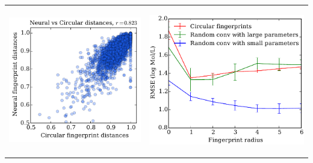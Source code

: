 \documentclass[landscape,a0b,final,a4resizeable]{include/a0poster}
\begin{document}
\begin{poster}
\begin{multicols}{3}
\begin{tabular}{cc}
\begin{minipage}[c]{0.45\columnwidth}
\includegraphics[width=\columnwidth]{figures/fig_2.pdf}
\end{minipage} & 
\begin{minipage}[c]{0.45\columnwidth}
\begin{center}
\vspace{0.5cm}\includegraphics[width=\columnwidth]{figures/fig_3.pdf}
\end{center}
\end{minipage}
\end{tabular}


\end{multicols}
\end{poster}
\end{document}
